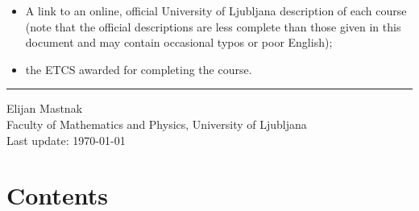 \documentclass[11pt, a4paper]{article}
\begin{document}
\begin{center}
\begin{minipage}[t]{0.90\textwidth}
\begin{itemize}
        \item A link to an online, official University of Ljubljana description of each course
        (note that the official descriptions are less complete than those given in this document and may contain occasional typos or poor English);

        \item the ETCS awarded for completing the course.

    \end{itemize}
\end{minipage}

\vfill

\rule{7cm}{0.4pt}

Elijan Mastnak\\
Faculty of Mathematics and Physics, University of Ljubljana\\
Last update: \today

\end{center}
\newpage

\section*{Contents}
\pagestyle{empty}
\end{document}
